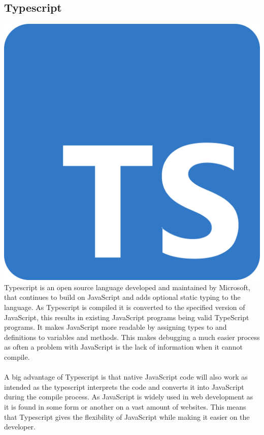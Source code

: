 \subsection{Typescript}
\includegraphics[scale=0.015]{./img/TS.PNG}
Typescript is an open source language developed and maintained by Microsoft, that continues to build on JavaScript and adds optional static typing to the language. As Typescript is compiled it is converted to the specified version of JavaScript, this results in existing JavaScript programs being valid TypeScript programs.  It makes JavaScript more readable by assigning types to and definitions to variables and methods. This makes debugging a much easier process as often a problem with JavaScript is the lack of information when it cannot compile. \\\\
A big advantage of Typescript is that native JavaScript code will also work as intended as the typescript interprets the code and converts it into JavaScript during the compile process. As JavaScript is widely used in web development as it is found in some form or another on a vast amount of websites. This means that Typescript gives the flexibility of JavaScript while making it easier on the developer.

